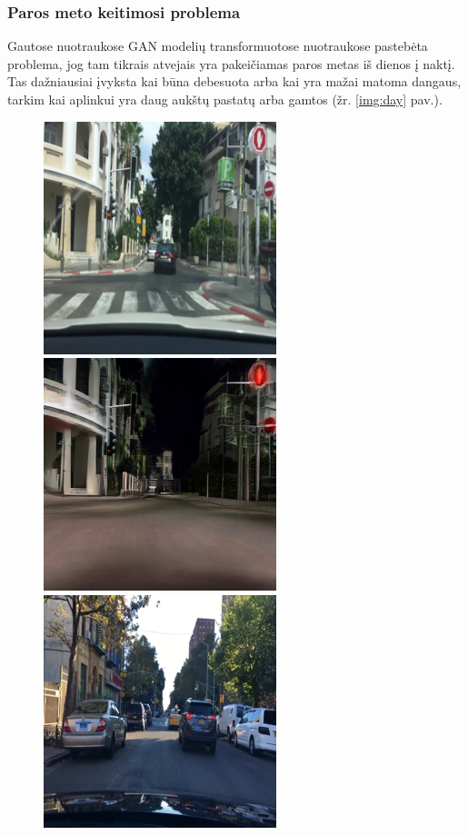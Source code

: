 \documentclass{VUMIFPSbakalaurinis}
\begin{document}
        \subsubsection{Paros meto keitimosi problema}
                Gautose nuotraukose GAN modelių transformuotose nuotraukose pastebėta problema, jog tam tikrais atvejais yra pakeičiamas paros metas iš dienos į naktį. Tas dažniausiai įvyksta kai būna debesuota arba kai yra mažai matoma dangaus, tarkim kai aplinkui yra daug aukštų pastatų arba gamtos (žr. \ref{img:day} pav.).
                \begin{figure}[H]
                    \centering
                    \includegraphics[scale=0.7]{img/aukstu_pastatu_real}
                    \includegraphics[scale=0.7]{img/aukstu_pastatu_fake}
                    \includegraphics[scale=0.7]{img/debesu_real}

\end{figure}
\end{document}
